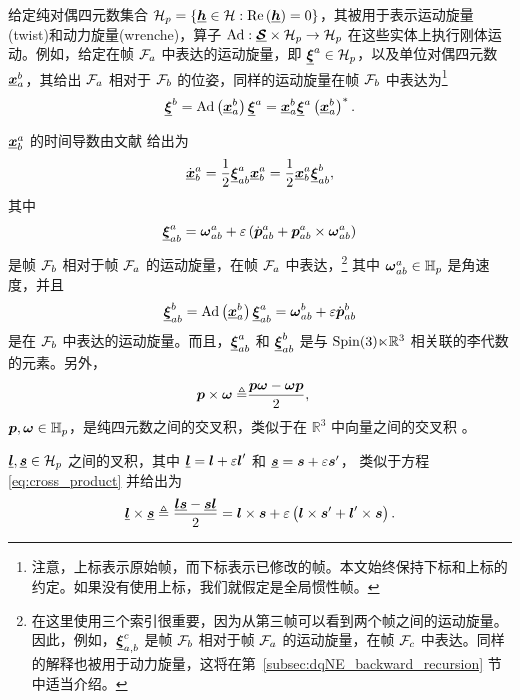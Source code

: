 给定纯对偶四元数集合 $\mathcal{H}_{p}=\left\{ \dq h\in\mathcal{H}:\real{\dq h}=0\right\}$，其被用于表示运动旋量(twist)和动力旋量(wrenche)，算子 $\mathrm{Ad}:\dq{\mathcal{S}}\times\mathcal{H}_{p}\to\mathcal{H}_{p}$ 在这些实体上执行刚体运动。例如，给定在帧 $\frame a$ 中表达的运动旋量，即 $\dq{\xi}^{a}\in\mathcal{H}_{p}$，以及单位对偶四元数 $\dq x_{a}^{b}$，其给出 $\frame a$ 相对于 $\frame b$ 的位姿，同样的运动旋量在帧 $\frame b$ 中表达为\footnote{注意，上标表示原始帧，而下标表示已修改的帧。本文始终保持下标和上标的约定。如果没有使用上标，我们就假定是全局惯性帧。}
\begin{equation}
\dq{\xi}^{b}=\ad{\dq x_{a}^{b}}{\dq{\xi}^{a}}=\dq x_{a}^{b}\dq{\xi}^{a}\left(\dq x_{a}^{b}\right)^{*}.\label{eq:adj_transf}
\end{equation}

$\dq x_{b}^{a}$ 的时间导数由文献 \cite{Adorno2017} 给出为
\begin{equation}
\dot{\dq x}_{b}^{a}=\frac{1}{2}\dq{\xi}_{ab}^{a}\dq x_{b}^{a}=\frac{1}{2}\dq x_{b}^{a}\dq{\xi}_{ab}^{b},\label{eq:x_dot}
\end{equation}
其中 
\begin{gather}
\dq{\xi}_{ab}^{a}=\quat{\omega}_{ab}^{a}+\dual\left(\dot{\quat p}_{ab}^{a}+\quat p_{ab}^{a}\times\quat{\omega}_{ab}^{a}\right)\label{eq:twist-inertial-frame}
\end{gather}
是帧 $\frame b$ 相对于帧 $\frame a$ 的运动旋量，在帧 $\frame a$ 中表达，\footnote{在这里使用三个索引很重要，因为从第三帧可以看到两个帧之间的运动旋量。因此，例如，$\dq{\xi}_{a,b}^{c}$ 是帧 $\frame b$ 相对于帧 $\frame a$ 的运动旋量，在帧 $\frame c$ 中表达。同样的解释也被用于动力旋量，这将在第~\ref{subsec:dqNE_backward_recursion} 节中适当介绍。} 其中 $\quat{\omega}_{ab}^{a}\in\mathbb{H}_{p}$ 是角速度，并且
\begin{gather}
\dq{\xi}_{ab}^{b}=\ad{\dq x_{a}^{b}}{\dq{\xi}_{ab}^{a}}=\quat{\omega}_{ab}^{b}+\dual\dot{\quat p}_{ab}^{b}\label{eq:twist-body-frame}
\end{gather}
是在 $\frame b$ 中表达的运动旋量。而且，$\dq{\xi}_{ab}^{a}$ 和 $\dq{\xi}_{ab}^{b}$ 是与 $\spinr$ 相关联的李代数的元素。另外，
\begin{align}
\quat p\times\quat{\omega}\triangleq & \frac{\quat p\quat{\omega}-\quat{\omega}\quat p}{2},\label{eq:cross_product}
\end{align}
$\quat p,\quat{\omega}\in\mathbb{H}_{p}$，是纯四元数之间的交叉积，类似于在 $\mathbb{R}^{3}$ 中向量之间的交叉积 \cite{Adorno2017}。

$\dq l,\dq s\in\mathcal{H}_{p}$ 之间的叉积，其中
$\dq l=\quat l+\dual\quat l'$ 和 $\dq s=\quat s+\dual\quat s'$，
类似于方程 \eqref{eq:cross_product} 并给出为
\begin{equation}
\dq l\times\dq s\triangleq\frac{\dq l\dq s-\dq s\dq l}{2}=\quat l\times\quat s+\dual\left(\quat l\times\quat s'+\quat l'\times\quat s\right).\label{eq:cross_product_dq}
\end{equation}

